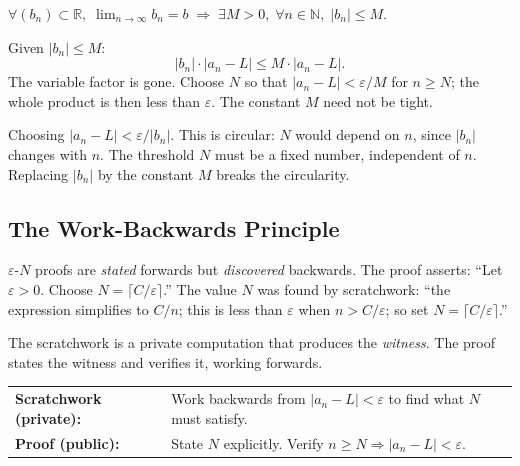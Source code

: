 \begin{remark*}
\end{remark*}


\begin{remark}
$\forall(b_n)\subset\mathbb{R},\;\lim_{n\to\infty}b_n=b
\;\Rightarrow\;
\exists M>0,\;\forall n\in\mathbb{N},\;|b_n|\leq M$.
\end{remark}

\begin{remark}
Given $|b_n|\leq M$:
\[
  |b_n|\cdot|a_n-L|\leq M\cdot|a_n-L|.
\]
The variable factor is gone. Choose $N$ so that $|a_n-L|<\varepsilon/M$ for
$n\geq N$; the whole product is then less than $\varepsilon$. The constant $M$
need not be tight.
\end{remark}

\begin{remark}
Choosing $|a_n-L|<\varepsilon/|b_n|$. This is circular: $N$ would depend on
$n$, since $|b_n|$ changes with $n$. The threshold $N$ must be a fixed
number, independent of $n$. Replacing $|b_n|$ by the constant $M$ breaks
the circularity.
\end{remark}

\subsection*{The Work-Backwards Principle}
\label{subsec:work-backwards}

$\varepsilon$-$N$ proofs are \emph{stated} forwards but \emph{discovered}
backwards. The proof asserts: ``Let $\varepsilon>0$. Choose
$N=\lceil C/\varepsilon\rceil$.'' The value $N$ was found by scratchwork:
``the expression simplifies to $C/n$; this is less than $\varepsilon$ when
$n>C/\varepsilon$; so set $N=\lceil C/\varepsilon\rceil$.''

The scratchwork is a private computation that produces the \emph{witness}.
The proof states the witness and verifies it, working forwards.

\medskip
\begin{tabular}{@{}ll@{}}
\textbf{Scratchwork (private):}
  & Work backwards from $|a_n-L|<\varepsilon$ to find what $N$ must satisfy.\\
\textbf{Proof (public):}
  & State $N$ explicitly. Verify $n\geq N\Rightarrow|a_n-L|<\varepsilon$.
\end{tabular}

